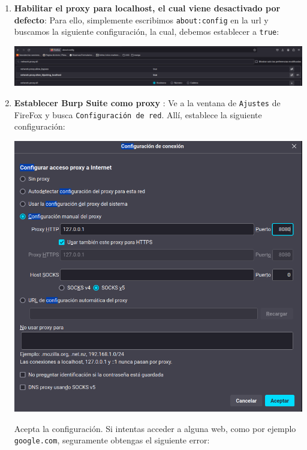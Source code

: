 \begin{enumerate}
    \item \textbf{Habilitar el proxy para localhost, el cual viene desactivado por defecto}: Para ello, simplemente escribimos \texttt{about:config} en la url y buscamos la siguiente configuración, la cual, debemos establecer a \texttt{true}:

    \begin{center}
        \includegraphics[scale=0.17]{imagenes/Captura desde 2024-05-26 22-29-09.png}
    \end{center}

    \item \textbf{Establecer Burp Suite como proxy} : Ve a la ventana de \texttt{Ajustes} de FireFox y busca \texttt{Configuración de red}. Allí, establece la siguiente configuración:

    \begin{center}
        \includegraphics[scale=0.28]{imagenes/Captura desde 2024-05-26 22-28-28.png}
    \end{center}

    Acepta la configuración. Si intentas acceder a alguna web, como por ejemplo \texttt{google.com}, seguramente obtengas el siguiente error:


\end{enumerate}
